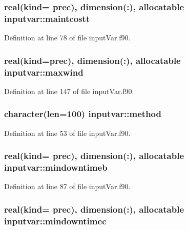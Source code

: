 \hypertarget{classinputvar_abeac95d7e558ca06d4456187b380fdbc}{
\subsubsection[{maintcostt}]{\setlength{\rightskip}{0pt plus 5cm}real(kind= prec), dimension(\-:), allocatable inputvar\-::maintcostt}}\label{classinputvar_abeac95d7e558ca06d4456187b380fdbc}


Definition at line 78 of file input\-Var.\-f90.

\hypertarget{classinputvar_a42a243861fa635356cdd79a587633909}{
\subsubsection[{maxwind}]{\setlength{\rightskip}{0pt plus 5cm}real(kind=prec), dimension(\-:), allocatable inputvar\-::maxwind}}\label{classinputvar_a42a243861fa635356cdd79a587633909}


Definition at line 147 of file input\-Var.\-f90.

\hypertarget{classinputvar_ad9c1a09ed4bd46ad673997ee302451a4}{
\subsubsection[{method}]{\setlength{\rightskip}{0pt plus 5cm}character(len=100) inputvar\-::method}}\label{classinputvar_ad9c1a09ed4bd46ad673997ee302451a4}


Definition at line 53 of file input\-Var.\-f90.

\hypertarget{classinputvar_ae93da8603e9899963da53596705b1d98}{
\subsubsection[{mindowntimeb}]{\setlength{\rightskip}{0pt plus 5cm}real(kind= prec), dimension(\-:), allocatable inputvar\-::mindowntimeb}}\label{classinputvar_ae93da8603e9899963da53596705b1d98}


Definition at line 87 of file input\-Var.\-f90.

\hypertarget{classinputvar_a9bb1424e04e5c89d561d2316045f98d4}{
\subsubsection[{mindowntimec}]{\setlength{\rightskip}{0pt plus 5cm}real(kind= prec), dimension(\-:), allocatable inputvar\-::mindowntimec}}\label{classinputvar_a9bb1424e04e5c89d561d2316045f98d4}


